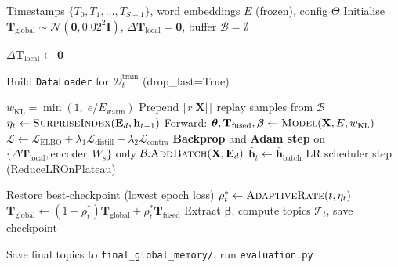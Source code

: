 \documentclass[11pt,a4paper]{article}
\begin{document}
\begin{algorithm}[h]
\caption{LLM-CoNTM Streaming Training Pipeline}
\label{alg:streaming}
\begin{algorithmic}[1]
\Require Timestamps $\{T_0, T_1, \dots, T_{S-1}\}$, word embeddings $E$ (frozen),
         config $\Theta$
\State Initialise $\mathbf{T}_\text{global} \sim \mathcal{N}(\mathbf{0}, 0.02^2\mathbf{I})$,
       $\Delta\mathbf{T}_\text{local} = \mathbf{0}$, buffer $\mathcal{B} = \emptyset$


    \State $\Delta\mathbf{T}_\text{local} \leftarrow \mathbf{0}$ 
  \EndIf

  \State Build \texttt{DataLoader} for $\mathcal{D}_t^{\text{train}}$ (drop\_last=True)

    \State $w_\text{KL} = \min(1,\; e / E_{\text{warm}})$
      \State Prepend $\lfloor r|\mathbf{X}|\rfloor$ replay samples from $\mathcal{B}$
      \State $\eta_t \leftarrow \textsc{SurpriseIndex}(\mathbf{E}_d, \bar{\mathbf{h}}_{t-1})$
      \State Forward: $\boldsymbol{\theta}, \mathbf{T}_\text{fused}, \boldsymbol{\beta}
             \leftarrow \textsc{Model}(\mathbf{X}, E, w_\text{KL})$
      \State $\mathcal{L} \leftarrow \mathcal{L}_\text{ELBO} + \lambda_1\mathcal{L}_\text{distill}
             + \lambda_2\mathcal{L}_\text{contra}$ 
      \State \textbf{Backprop} and \textbf{Adam step} on $\{\Delta\mathbf{T}_\text{local},
             \text{encoder}, W_s\}$ only
      \State $\mathcal{B}.\textsc{AddBatch}(\mathbf{X}, \mathbf{E}_d)$
      \State $\bar{\mathbf{h}}_{t} \leftarrow \bar{\mathbf{h}}_{\text{batch}}$
    \EndFor
    \State LR scheduler step (ReduceLROnPlateau)
  \EndFor

  \State Restore best-checkpoint (lowest epoch loss) \label{alg:restore}
  \State $\rho_t^* \leftarrow \textsc{AdaptiveRate}(t, \eta_t)$
  \State $\mathbf{T}_\text{global} \leftarrow
         (1-\rho_t^*)\mathbf{T}_\text{global} + \rho_t^*\mathbf{T}_\text{fused}$
  \State Extract $\boldsymbol{\beta}$, compute topics $\mathcal{T}_t$, save checkpoint
\EndFor

\State Save final topics to \texttt{final\_global\_memory/}, run \texttt{evaluation.py}
\end{algorithmic}
\end{algorithm}
\end{document}
